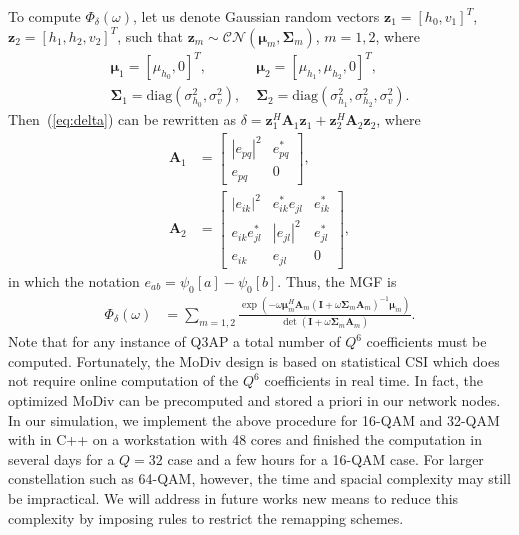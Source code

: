 \documentclass[journal]{IEEEtran}
\begin{document}
To compute $\Phi_{\delta}(\omega)$, let us denote Gaussian random vectors
$\mathbf{z}_1 = [h_0, v_1]^T$, $\mathbf{z}_{2} = [h_1, h_2, v_2]^T$, such
that $\mathbf{z}_m\sim\mathcal{CN}(\bm{\mu}_m, \mathbf{\Sigma}_m)$, $m=1,2$,
where
\begin{align}
    \bm{\mu}_1 = [\mu_{h_0}, 0]^T,& \; \bm{\mu}_{2} = [\mu_{h_1}, \mu_{h_2},
    0]^T,
    \\
    \mathbf{\Sigma}_1 = \mbox{diag}\left(\sigma_{h_0}^2, \sigma_v^2\right), & \;
    \mathbf{\Sigma}_2 = \mbox{diag}\left(\sigma_{h_1}^2, \sigma_{h_2}^2,
    \sigma_v^2\right).
\end{align}
Then~(\ref{eq:delta}) can be rewritten as $\delta =
\mathbf{z}_1^H\mathbf{A}_1\mathbf{z}_1 +
\mathbf{z}_{2}^H\mathbf{A}_{2}\mathbf{z}_{2}$, where
\begin{subequations}
    \begin{align}
        \mathbf{A}_1 & = \left[
            \begin{array}{cc}
                |e_{pq}|^2  & e_{pq}^* \\
                e_{pq} & 0
            \end{array}
        \right], \\
        \mathbf{A}_2 & = \left[
            \begin{array}{ccc}
            |e_{ik}|^2 & e_{ik}^*e_{jl} & e_{ik}^*
            \\
            e_{ik}e_{jl}^* & |e_{jl}|^2 & e_{jl}^*
            \\
            e_{ik} & e_{jl} & 0
        \end{array}
        \right],
    \end{align}
\end{subequations}
in which the notation $e_{ab} = \psi_0[a] - \psi_0[b]$. Thus, the MGF is
\begin{align}
    \Phi_{\delta}(\omega) & = \sum_{m=1,2}
    \frac{\exp(-\omega\bm{\mu}_m^H\mathbf{A}_m(\mathbf{I} +
    \omega\mathbf{\Sigma}_m\mathbf{A}_m)^{-1}\bm{\mu}_m)}{\det(\mathbf{I} +
    \omega\mathbf{\Sigma}_m\mathbf{A}_m)}.
\end{align}
Note that for any instance of Q3AP a total number of $Q^6$ coefficients must be
computed. Fortunately, the MoDiv design is based on statistical CSI which does
not require online computation of the $Q^6$ coefficients in real time. In fact,
the optimized MoDiv can be precomputed and stored a priori in our network nodes.
In our simulation, we implement the above procedure for 16-QAM and 32-QAM with
in C++ on a workstation with 48 cores and finished the computation in several
days for a $Q=32$ case and a few hours for a 16-QAM case. For larger
constellation such as 64-QAM, however, the time and spacial complexity may still
be impractical. We will address in future works new means to reduce this complexity by 
imposing rules to restrict the remapping schemes.
\end{document}
